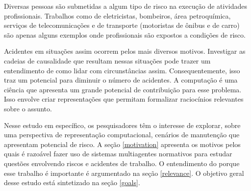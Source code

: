 Diversas pessoas são submetidas a algum tipo de risco na execução de atividades profissionais. Trabalhos como de eletricistas, bombeiros, área petroquímica, serviços de telecomunicações e de transporte (motoristas de ônibus e de carro) são apenas alguns exemplos onde profissionais são expostos a condições de risco.

Acidentes em situações assim ocorrem pelos mais diversos motivos. Investigar as cadeias de causalidade que resultam nessas situações pode trazer um entendimento de como lidar com circunstâncias assim. Consequentemente, isso traz um potencial para diminuir o número de acidentes. A computação é uma ciência que apresenta um grande potencial de contribuição para esse problema. Isso envolve criar representações que permitam formalizar raciocínios relevantes sobre o assunto.

Nesse estudo em específico, os pesquisadores têm o interesse de explorar, sobre uma perspectiva de representação computacional, cenários de manutenção que apresentam potencial de risco. A seção \ref{motivation} apresenta os motivos pelos quais é razoável fazer uso de sistemas multiagentes normativos para estudar questões envolvendo riscos e acidentes de trabalho. O entendimento do porque esse trabalho é importante é argumentado na seção \ref{relevance}. O objetivo geral desse estudo está sintetizado na seção \ref{goals}.